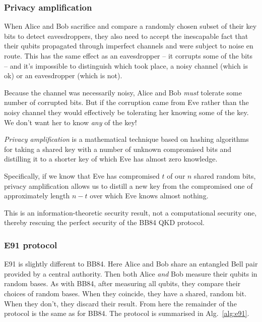 %
%

\subsubsection{Privacy amplification}

When Alice and Bob sacrifice and compare a randomly chosen subset of their key bits to detect eavesdroppers, they also need to accept the inescapable fact that their qubits propagated through imperfect channels and were subject to noise en route. This has the same effect as an eavesdropper -- it corrupts some of the bits -- and it's impossible to distinguish which took place, a noisy channel (which is ok) or an eavesdropper (which is not).

Because the channel was necessarily noisy, Alice and Bob \textit{must} tolerate some number of corrupted bits. But if the corruption came from Eve rather than the noisy channel they would effectively be tolerating her knowing some of the key. We don't want her to know \textit{any} of the key!

\textit{Privacy amplification} is a mathematical technique based on hashing algorithms for taking a shared key with a number of unknown compromised bits and distilling it to a shorter key of which Eve has almost zero knowledge.

Specifically, if we know that Eve has compromised $t$ of our $n$ shared random bits, privacy amplification allows us to distill a new key from the compromised one of approximately length \mbox{$n-t$} over which Eve knows almost nothing.

This is an information-theoretic security result, not a computational security one, thereby rescuing the perfect security of the BB84 QKD protocol.

%
%

\subsubsection{E91 protocol}

E91 is slightly different to BB84. Here Alice and Bob share an entangled Bell pair provided by a central authority. Then both Alice \textit{and} Bob measure their qubits in random bases. As with BB84, after measuring all qubits, they compare their choices of random bases. When they coincide, they have a shared, random bit. When they don't, they discard their result. From here the remainder of the protocol is the same as for BB84. The protocol is summarised in Alg.~\ref{alg:e91}.

